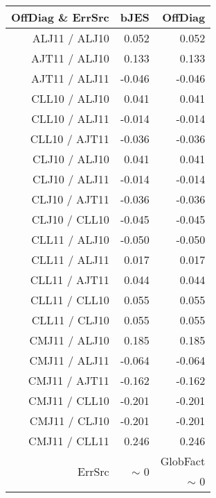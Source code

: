 \begin{table}[H]
\scriptsize
\begin{center}
\renewcommand{\arraystretch}{1.1}
\begin{tabular}{|r|r|r|}
\hline
 OffDiag \& ErrSrc & {\tiny bJES} & OffDiag\\
\hline
ALJ11 / ALJ10 &  \colorbox{Yellow1}{    0.052} &  \colorbox{Yellow1}{    0.052} \\
AJT11 / ALJ10 &  \colorbox{Orange1}{    0.133} &  \colorbox{Orange1}{    0.133} \\
AJT11 / ALJ11 &     -0.046 &     -0.046 \\
CLL10 / ALJ10 &      0.041 &      0.041 \\
CLL10 / ALJ11 &     -0.014 &     -0.014 \\
CLL10 / AJT11 &     -0.036 &     -0.036 \\
CLJ10 / ALJ10 &      0.041 &      0.041 \\
CLJ10 / ALJ11 &     -0.014 &     -0.014 \\
CLJ10 / AJT11 &     -0.036 &     -0.036 \\
CLJ10 / CLL10 &     -0.045 &     -0.045 \\
CLL11 / ALJ10 &     -0.050 &     -0.050 \\
CLL11 / ALJ11 &      0.017 &      0.017 \\
CLL11 / AJT11 &      0.044 &      0.044 \\
CLL11 / CLL10 &  \colorbox{Yellow1}{    0.055} &  \colorbox{Yellow1}{    0.055} \\
CLL11 / CLJ10 &  \colorbox{Yellow1}{    0.055} &  \colorbox{Yellow1}{    0.055} \\
CMJ11 / ALJ10 &  \colorbox{Tomato1}{    0.185} &  \colorbox{Tomato1}{    0.185} \\
CMJ11 / ALJ11 &     -0.064 &     -0.064 \\
CMJ11 / AJT11 &     -0.162 &     -0.162 \\
CMJ11 / CLL10 &     -0.201 &     -0.201 \\
CMJ11 / CLJ10 &     -0.201 &     -0.201 \\
CMJ11 / CLL11 &  \colorbox{Tomato1}{    0.246} &  \colorbox{Tomato1}{    0.246} \\
\hline
\multirow{2}{*}{ErrSrc} & \multirow{2}{*}{ {\tiny $\sim$ }0} & GlobFact\\
 & &  {\tiny $\sim$ }0 \\
\hline
\end{tabular}
\renewcommand{\arraystretch}{1}

\end{center}
\end{table}
